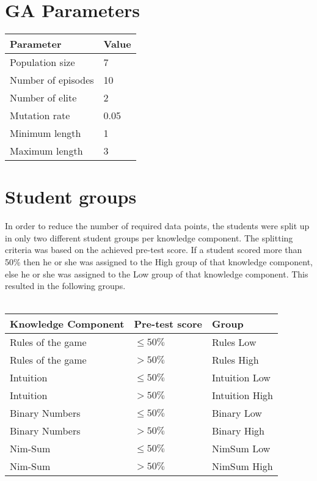 \section{GA Parameters}
\begin{tabular}{ll}\hline
	\textbf{Parameter} &  \textbf{Value}\\\hline
	Population size & 7 \\
	Number of episodes & 10 \\
	Number of elite & 2 \\
	Mutation rate & 0.05 \\
	Minimum length & 1 \\
	Maximum length & 3 \\
\end{tabular}
\section{Student groups}
In order to reduce the number of required data points, the students were split
up in only two different student groups per knowledge component. The splitting
criteria was based on the achieved pre-test score. If a student scored more
than 50\% then he or she was assigned to the High group of that knowledge
component, else he or she was assigned to the Low group of that knowledge
component. This resulted in the following groups.\\\\
\begin{tabular}{lll}\hline
	\textbf{Knowledge Component} & \textbf{Pre-test score}    & \textbf{Group} \\\hline
	Rules of the game	& $\leq 50\%$		& Rules Low \\
	Rules of the game	& $> 50\%$			& Rules High \\
	Intuition			& $\leq 50\%$		& Intuition Low \\
	Intuition			& $> 50\%$			& Intuition High \\
	Binary Numbers		& $\leq 50\%$		& Binary Low \\
	Binary Numbers		& $> 50\%$			& Binary High \\
	Nim-Sum				& $\leq 50\%$		& NimSum Low \\
	Nim-Sum				& $> 50\%$			& NimSum High \\
\end{tabular}
